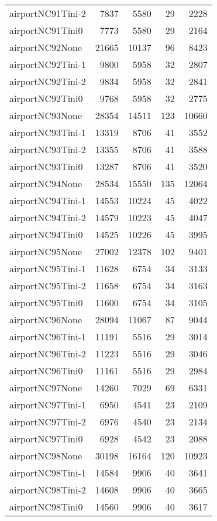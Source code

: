 \begin{longtable}{lrrrr}
airportNC91Tini-2 & 7837 & 5580 & 29 & 2228 \\
airportNC91Tini0 & 7773 & 5580 & 29 & 2164 \\
airportNC92None & 21665 & 10137 & 96 & 8423 \\
airportNC92Tini-1 & 9800 & 5958 & 32 & 2807 \\
airportNC92Tini-2 & 9834 & 5958 & 32 & 2841 \\
airportNC92Tini0 & 9768 & 5958 & 32 & 2775 \\
airportNC93None & 28354 & 14511 & 123 & 10660 \\
airportNC93Tini-1 & 13319 & 8706 & 41 & 3552 \\
airportNC93Tini-2 & 13355 & 8706 & 41 & 3588 \\
airportNC93Tini0 & 13287 & 8706 & 41 & 3520 \\
airportNC94None & 28534 & 15550 & 135 & 12064 \\
airportNC94Tini-1 & 14553 & 10224 & 45 & 4022 \\
airportNC94Tini-2 & 14579 & 10223 & 45 & 4047 \\
airportNC94Tini0 & 14525 & 10226 & 45 & 3995 \\
airportNC95None & 27002 & 12378 & 102 & 9401 \\
airportNC95Tini-1 & 11628 & 6754 & 34 & 3133 \\
airportNC95Tini-2 & 11658 & 6754 & 34 & 3163 \\
airportNC95Tini0 & 11600 & 6754 & 34 & 3105 \\
airportNC96None & 28094 & 11067 & 87 & 9044 \\
airportNC96Tini-1 & 11191 & 5516 & 29 & 3014 \\
airportNC96Tini-2 & 11223 & 5516 & 29 & 3046 \\
airportNC96Tini0 & 11161 & 5516 & 29 & 2984 \\
airportNC97None & 14260 & 7029 & 69 & 6331 \\
airportNC97Tini-1 & 6950 & 4541 & 23 & 2109 \\
airportNC97Tini-2 & 6976 & 4540 & 23 & 2134 \\
airportNC97Tini0 & 6928 & 4542 & 23 & 2088 \\
airportNC98None & 30198 & 16164 & 120 & 10923 \\
airportNC98Tini-1 & 14584 & 9906 & 40 & 3641 \\
airportNC98Tini-2 & 14608 & 9906 & 40 & 3665 \\
airportNC98Tini0 & 14560 & 9906 & 40 & 3617 \\

\end{longtable}
